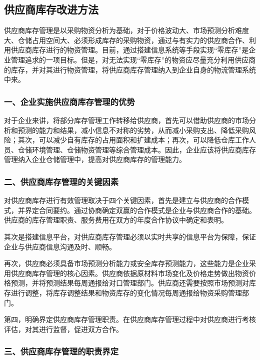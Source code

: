 \subsection { 供应商库存改进方法}

    供应商库存管理是以采购物资分析为基础，对于价格波动大、市场预测分析难度大、仓储占用空间大、必须形成库存的采购物资，通过与有实力的供应商合作、利用供应商库存进行的物资管理。目前，通过搭建信息系统等手段实现“零库存”是企业管理追求的一项目标。但是，对无法实现“零库存”的物资应尽量充分利用供应商的库存，并对其进行物资管理，将供应商库存管理纳入到企业自身的物流管理系统中来。

\subsubsection { 一、企业实施供应商库存管理的优势}

    对于企业来讲，将部分库存管理工作转移给供应商，首先可以借助供应商的市场分析和预测的能力和结果，减小信息不对称的劣势，从而减小采购支出、降低采购风险；其次，可以减少自有库存的占用面积和扩建成本；再次，可以降低仓库工作人员、仓储环境管理、仓储物资管理等综合管理成本。因此，企业应该将供应商库存管理纳入企业仓储管理中，提高对供应商库存的管理能力。

\subsubsection { 二、供应商库存管理的关键因素}

    对供应商库存进行有效管理取决于四个关键因素，首先是建立与供应商的合作模式，并界定合同要约。通过协商确定双赢的合作模式是企业与供应商合作的基础。供应商的库存管理职责、服务费用在双方的年度合作协议中确定和表明。

    其次是搭建信息平台，对供应商库存管理必须以实时共享的信息平台为保障，保证企业与供应商信息沟通及时、顺畅。

    再次，供应商必须具备市场预测分析能力或安全库存预测能力，这些能力是企业采用供应商库存管理的核心因素。供应商依据原材料市场变化及价格走势做出物资价格预测，并将预测结果每周通报给对口管理部门。供应商还需要按照市场预测对库存进行调整，将库存调整结果和物资库存的变化情况每周通报给物资采购管理部门。

    第四，明确界定供应商库存管理职责。在供应商库存管理过程中对供应商进行考核评估，对其进行监督，促进双方合作。

\subsubsection { 三、供应商库存管理的职责界定}

